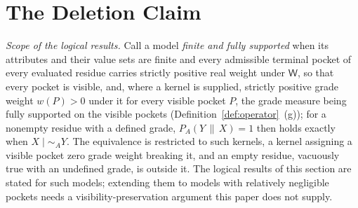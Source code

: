 \section{The Deletion Claim}\label{sec:deletion}
\noindent\textit{Scope of the logical results.} Call a model \emph{finite and fully supported} when its attributes and their value sets are finite and every admissible terminal pocket of every evaluated residue carries strictly positive real weight under $\mathsf{W}$, so that every pocket is visible, and, where a kernel is supplied, strictly positive grade weight $w(P) > 0$ under it for every visible pocket $P$, the grade measure being fully supported on the visible pockets (Definition~\ref{def:operator}~(g)); for a nonempty residue with a defined grade, $P_A(Y \,\|\, X) = 1$ then holds exactly when $X \mid\sim_A Y$. The equivalence is restricted to such kernels, a kernel assigning a visible pocket zero grade weight breaking it, and an empty residue, vacuously true with an undefined grade, is outside it. The logical results of this section are stated for such models; extending them to models with relatively negligible pockets needs a visibility-preservation argument this paper does not supply.

